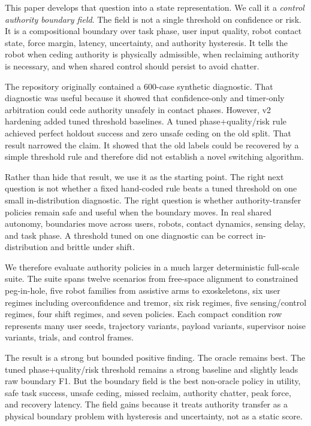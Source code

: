\documentclass{article}
\begin{document}
This paper develops that question into a state representation. We call it a \emph{control authority boundary field}. The field is not a single threshold on confidence or risk. It is a compositional boundary over task phase, user input quality, robot contact state, force margin, latency, uncertainty, and authority hysteresis. It tells the robot when ceding authority is physically admissible, when reclaiming authority is necessary, and when shared control should persist to avoid chatter.

The repository originally contained a 600-case synthetic diagnostic. That diagnostic was useful because it showed that confidence-only and timer-only arbitration could cede authority unsafely in contact phases. However, v2 hardening added tuned threshold baselines. A tuned phase+quality/risk rule achieved perfect holdout success and zero unsafe ceding on the old split. That result narrowed the claim. It showed that the old labels could be recovered by a simple threshold rule and therefore did not establish a novel switching algorithm.

Rather than hide that result, we use it as the starting point. The right next question is not whether a fixed hand-coded rule beats a tuned threshold on one small in-distribution diagnostic. The right question is whether authority-transfer policies remain safe and useful when the boundary moves. In real shared autonomy, boundaries move across users, robots, contact dynamics, sensing delay, and task phase. A threshold tuned on one diagnostic can be correct in-distribution and brittle under shift.

We therefore evaluate authority policies in a much larger deterministic full-scale suite. The suite spans twelve scenarios from free-space alignment to constrained peg-in-hole, five robot families from assistive arms to exoskeletons, six user regimes including overconfidence and tremor, six risk regimes, five sensing/control regimes, four shift regimes, and seven policies. Each compact condition row represents many user seeds, trajectory variants, payload variants, supervisor noise variants, trials, and control frames.

The result is a strong but bounded positive finding. The oracle remains best. The tuned phase+quality/risk threshold remains a strong baseline and slightly leads raw boundary F1. But the boundary field is the best non-oracle policy in utility, safe task success, unsafe ceding, missed reclaim, authority chatter, peak force, and recovery latency. The field gains because it treats authority transfer as a physical boundary problem with hysteresis and uncertainty, not as a static score.
\end{document}
